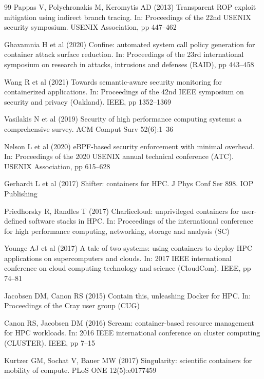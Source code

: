 \documentclass[]{sn-jnl}
\begin{document}
\begin{thebibliography}{99}
Pappas V, Polychronakis M, Keromytis AD (2013) Transparent ROP exploit mitigation
using indirect branch tracing. In: Proceedings of the 22nd USENIX security
symposium. USENIX Association, pp 447--462

Ghavamnia H et al (2020) Confine: automated system call policy generation for
container attack surface reduction. In: Proceedings of the 23rd international
symposium on research in attacks, intrusions and defenses (RAID), pp 443--458

Wang R et al (2021) Towards semantic-aware security monitoring for containerized
applications. In: Proceedings of the 42nd IEEE symposium on security and privacy
(Oakland). IEEE, pp 1352--1369

Vasilakis N et al (2019) Security of high performance computing systems: a
comprehensive survey. ACM Comput Surv 52(6):1--36

Nelson L et al (2020) eBPF-based security enforcement with minimal overhead.
In: Proceedings of the 2020 USENIX annual technical conference (ATC).
USENIX Association, pp 615--628

Gerhardt L et al (2017) Shifter: containers for HPC. J Phys Conf Ser 898.
IOP Publishing

Priedhorsky R, Randles T (2017) Charliecloud: unprivileged containers for
user-defined software stacks in HPC. In: Proceedings of the international
conference for high performance computing, networking, storage and analysis (SC)

Younge AJ et al (2017) A tale of two systems: using containers to deploy HPC
applications on supercomputers and clouds. In: 2017 IEEE international conference
on cloud computing technology and science (CloudCom). IEEE, pp 74--81

Jacobsen DM, Canon RS (2015) Contain this, unleashing Docker for HPC.
In: Proceedings of the Cray user group (CUG)

Canon RS, Jacobsen DM (2016) Scream: container-based resource management for HPC
workloads. In: 2016 IEEE international conference on cluster computing (CLUSTER).
IEEE, pp 7--15

Kurtzer GM, Sochat V, Bauer MW (2017) Singularity: scientific containers for
mobility of compute. PLoS ONE 12(5):e0177459


\end{thebibliography}
\end{document}
